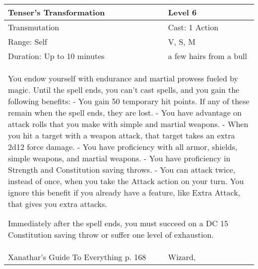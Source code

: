 \documentclass[11pt]{report}
\begin{document}
\begin{table}[H]
	\begin{tabular}{||p{6cm}|p{6cm}||}
		\hline\hline
		\bf{Tenser’s Transformation} & Level 6\\ \hline
		Transmutation & Cast: 1 Action\\ \hline
		Range: Self & V, S, M\\ \hline
		Duration: Up to 10 minutes & a few hairs from a bull\\ \hline
		\multicolumn{2}{||p{12cm}||}{You endow yourself with endurance and martial prowess fueled by magic. Until the spell ends, you can’t cast spells, and you gain the following benefits:
- You gain 50 temporary hit points. If any of these remain when the spell ends, they are lost.
- You have advantage on attack rolls that you make with simple and martial weapons.
- When you hit a target with a weapon attack, that target takes an extra 2d12 force
damage.
- You have proficiency with all armor, shields, simple weapons, and martial weapons.
- You have proficiency in Strength and Constitution saving throws.
- You can attack twice, instead of once, when you take the Attack action on your turn. You ignore this benefit if you already have a feature, like Extra Attack, that gives you extra attacks.

Immediately after the spell ends, you must succeed on a DC 15 Constitution saving throw or suffer one level of exhaustion.}\\ \hline
Xanathar's Guide To Everything p. 168 & Wizard, \\ \hline\hline
	\end{tabular}
\end{table}
\end{document}

